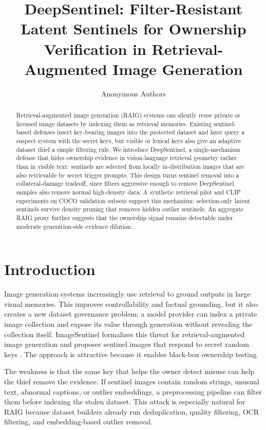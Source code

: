 \documentclass[letterpaper]{article}
\title{DeepSentinel: Filter-Resistant Latent Sentinels for Ownership Verification in Retrieval-Augmented Image Generation}
\author{Anonymous Authors}
\begin{document}
\maketitle

\begin{abstract}
Retrieval-augmented image generation (RAIG) systems can silently reuse private
or licensed image datasets by indexing them as retrieval memories. Existing
sentinel-based defenses insert key-bearing images into the protected dataset and
later query a suspect system with the secret keys, but visible or lexical keys
also give an adaptive dataset thief a simple filtering rule. We introduce
DeepSentinel, a single-mechanism defense that hides ownership evidence in
vision-language retrieval geometry rather than in visible text: sentinels are
selected from locally in-distribution images that are also retrievable by secret
trigger prompts. This design turns sentinel removal into a
collateral-damage tradeoff, since filters aggressive enough to remove
DeepSentinel samples also remove normal high-density data. A synthetic retrieval
pilot and CLIP experiments on COCO validation subsets support this mechanism:
selection-only latent sentinels survive density pruning that removes hidden
outlier sentinels. An aggregate RAIG proxy further suggests that the ownership
signal remains detectable under moderate generation-side evidence dilution.
\end{abstract}

\section{Introduction}

Image generation systems increasingly use retrieval to ground outputs in large
visual memories. This improves controllability and factual grounding, but it
also creates a new dataset governance problem: a model provider can index a
private image collection and expose its value through generation without
revealing the collection itself. ImageSentinel formalizes this threat for
retrieval-augmented image generation and proposes sentinel images that respond
to secret random keys \cite{imagesentinel2025}. The approach is attractive
because it enables black-box ownership testing.

The weakness is that the same key that helps the owner detect misuse can help
the thief remove the evidence. If sentinel images contain random strings,
unusual text, abnormal captions, or outlier embeddings, a preprocessing pipeline
can filter them before indexing the stolen dataset. This attack is especially
natural for RAIG because dataset builders already run deduplication, quality
filtering, OCR filtering, and embedding-based outlier removal.
\end{document}
